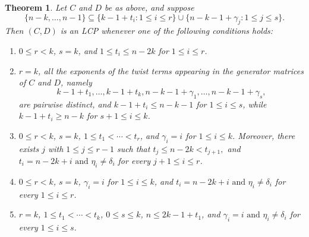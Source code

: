 \documentclass[12pt,draftcls,journal,onecolumn]{IEEEtran}
\newtheorem{theorem}{Theorem}
\begin{document}
\begin{theorem}\label{thm:01}
Let \(C\) and \(D\) be as above, and suppose
\[
\{n-k,\ldots,n-1\}
\subseteq
\{k-1+t_i:1\le i\le r\}
\cup
\{n-k-1+\gamma_j:1\le j\le s\}.
\]
Then \((C,D)\) is an LCP whenever one of the following conditions holds:

\begin{enumerate}
\renewcommand{\labelenumi}{(\roman{enumi})}

\item
\(0\le r<k\), \(s=k\), and
\(1\le t_i\le n-2k\) for \(1\le i\le r\).

\item
\(r=k\), all the exponents of the twist terms appearing in the
generator matrices of \(C\) and \(D\), namely
\[
k-1+t_1,\ldots,k-1+t_k, n-k-1+\gamma_1,\ldots,n-k-1+\gamma_s,
\]
are pairwise distinct, and
\(k-1+t_i\le n-k-1\) for \(1\le i\le s\), while
\(k-1+t_i\ge n-k\) for \(s+1\le i\le k\).

\item
\(0\le r<k\), \(s=k\),
\(1\le t_1<\cdots<t_r\), and
\(\gamma_i=i\) for \(1\le i\le k\).
Moreover, there exists \(j\) with \(1\le j\le r-1\) such that
\(
t_j\le n-2k<t_{j+1},
\)
and
$t_i=n-2k+i\text{ and }\eta_i\ne\delta_i$
for every \(j+1\le i\le r\).
\item
\(0\le r<k\), \(s=k\),
\(\gamma_i=i\) for \(1\le i\le k\), and $t_i=n-2k+i\text{ and }
\eta_i\ne\delta_i$ for every \(1\le i\le r\).

\item
\(r=k\), \(1\le t_1<\cdots<t_k\),
\(0\le s\le k\), \(n\le 2k-1+t_1\), and $\gamma_i=i\text{ and }
\eta_i\ne\delta_i$ for every \(1\le i\le s\).
\end{enumerate}
\end{theorem}
\end{document}
